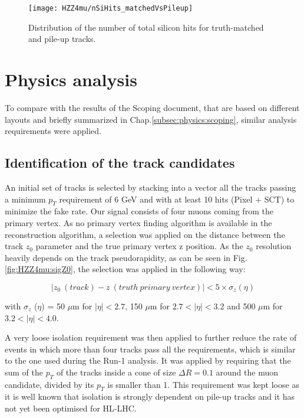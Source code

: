 \documentclass[a4paper,twoside,12pt]{book}
\begin{document}
\begin{figure}
\centering
\texttt{[image: HZZ4mu/nSiHits\_matchedVsPileup]}
\caption{Distribution of the number of total silicon hits for truth-matched and pile-up tracks.}
\label{fig:HZZ4mu:trackQuality}
\end{figure}

\section{Physics analysis}\label{sec:physics:analysis}
To compare with the results of the Scoping document, that 
are based on different layouts and briefly summarized in Chap.\ref{subsec:physics:scoping}, 
similar analysis requirements were applied. \\

\subsection{Identification of the track candidates}
An initial set of tracks is selected by stacking into a vector all the tracks passing a minimum
$p_{T}$ requirement of 6 GeV and with at least 10 hits (Pixel + SCT) to minimize the fake rate. 
Our signal consists
of four muons coming from the primary vertex. As no primary vertex finding algorithm
is available in the reconstruction algorithm, 
a selection was applied on the distance between the track $z_0$ parameter and the true primary vertex
z position. As the 
$z_0$ resolution heavily depends on the track pseudorapidity, as can be seen in Fig.
\ref{fig:HZZ4mu:sigZ0}, the selection was applied in the following way:

\begin{equation*}
|z_0\ (track) - z\ (truth\ primary\ vertex)| < 5 \times \sigma_{z} (\eta)
\end{equation*}

with $\sigma_{z}$ ($\eta$) = 50 $\mu$m for $|\eta| < 2.7$, 150 $\mu$m for $2.7 < |\eta| < 3.2$
and 500 $\mu$m for $3.2 < |\eta| < 4.0$. 

A very loose isolation requirement was then applied to further reduce the rate of events
in which more than four tracks pass all the requirements, which is similar to the one used during
the Run-1 analysis\cite{HZZ4mu_run1}. It was applied by requiring that the sum of the 
$p_T$ of the tracks inside a cone of size $\Delta R = 0.1$ around the muon
candidate, divided by its $p_T$ is smaller than 1. This requirement was kept loose as 
it is well known that isolation is strongly dependent on pile-up tracks and it has not yet
been optimised for HL-LHC.\\
\end{document}
